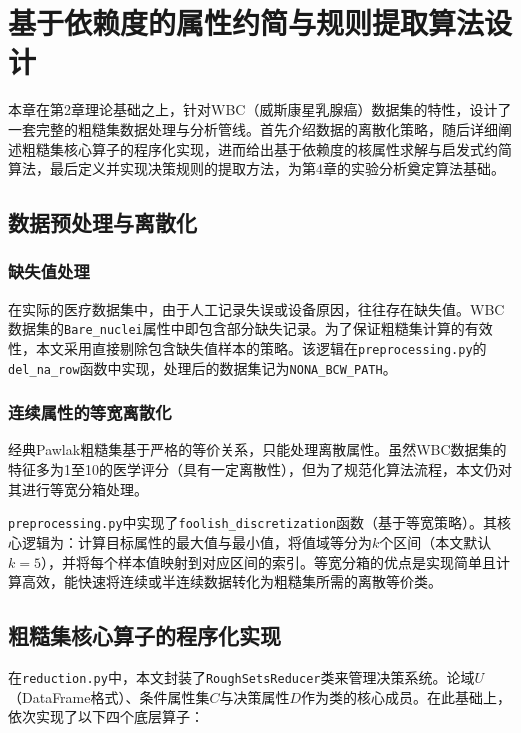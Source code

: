 
\chapter{基于依赖度的属性约简与规则提取算法设计}

本章在第2章理论基础之上，针对WBC（威斯康星乳腺癌）数据集的特性，设计了一套完整的粗糙集数据处理与分析管线。首先介绍数据的离散化策略，随后详细阐述粗糙集核心算子的程序化实现，进而给出基于依赖度的核属性求解与启发式约简算法，最后定义并实现决策规则的提取方法，为第4章的实验分析奠定算法基础。

\section{数据预处理与离散化}

\subsection{缺失值处理}

在实际的医疗数据集中，由于人工记录失误或设备原因，往往存在缺失值。WBC数据集的\texttt{Bare\_nuclei}属性中即包含部分缺失记录。为了保证粗糙集计算的有效性，本文采用直接剔除包含缺失值样本的策略。该逻辑在\texttt{preprocessing.py}的\texttt{del\_na\_row}函数中实现，处理后的数据集记为\texttt{NONA\_BCW\_PATH}。

\subsection{连续属性的等宽离散化}

经典Pawlak粗糙集基于严格的等价关系，只能处理离散属性。虽然WBC数据集的特征多为1至10的医学评分（具有一定离散性），但为了规范化算法流程，本文仍对其进行等宽分箱处理。

\texttt{preprocessing.py}中实现了\texttt{foolish\_discretization}函数（基于等宽策略）。其核心逻辑为：计算目标属性的最大值与最小值，将值域等分为\(k\)个区间（本文默认\(k=5\)），并将每个样本值映射到对应区间的索引。等宽分箱的优点是实现简单且计算高效，能快速将连续或半连续数据转化为粗糙集所需的离散等价类。

\section{粗糙集核心算子的程序化实现}

在\texttt{reduction.py}中，本文封装了\texttt{RoughSetsReducer}类来管理决策系统。论域\(U\)（DataFrame格式）、条件属性集\(C\)与决策属性\(D\)作为类的核心成员。在此基础上，依次实现了以下四个底层算子：

